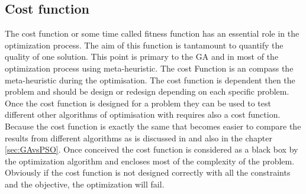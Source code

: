 
%
%
%




\subsection{Cost function }\label{sec:CostFunctionGA}
	The cost function or some time called fitness function has an essential role in the optimization process.  The aim of this function is tantamount to quantify the quality of one solution. This point is primary to the GA and in most of the optimization process using meta-heuristic. The cost Function is an compass the meta-heuristic during the  optimisation. 
	The cost function is dependent then the problem and should be design or redesign depending on each specific  problem. Once the cost function is designed for a problem they can be used to test different other algorithms of optimisation with requires also a cost function. 
	Because the cost function is exactly the same that becomes easier to compare the results from different algorithms as is discussed in \cite{79*franccois2001} and also in the chapter \ref{sec:GAvsPSO}.%
	Once conceived the cost function is considered as a black box by the optimization algorithm and encloses most of the complexity of the problem. Obviously if the cost function is not designed correctly with all the constraints and the objective, the optimization will fail.\\

